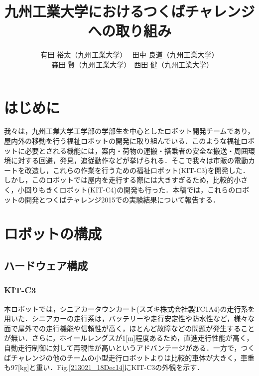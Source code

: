 \documentclass[10pt,a4paper]{jarticle}
\begin{document}
\title{\fontsize{16pt}{0pt}\selectfont 九州工業大学におけるつくばチャレンジへの取り組み}
\author{\fontsize{12pt}{0pt} 有田 裕太（九州工業大学）~ 田中 良道（九州工業大学） \\ ~ 森田 賢（九州工業大学）~西田 健（九州工業大学）}
\engtitle{
   \fontsize{16pt}{40pt}\selectfont 
}

\abstract{
\fontsize{9pt}{0pt}\selectfont
}

\maketitle\thispagestyle{empty}
\pagestyle{empty}

\section{はじめに}
\label{sec:intro}
我々は，九州工業大学工学部の学部生を中心としたロボット開発チームであり，屋内外の移動を行う福祉ロボットの開発に取り組んでいる．このような福祉ロボットに必要とされる機能には，案内・荷物の運搬・搭乗者の安全な搬送・周囲環境に対する回避，発見，追従動作などが挙げられる．そこで我々は市販の電動カートを改造し，これらの作業を行うための福祉ロボット(KIT-C3)を開発した．しかし，このロボットでは屋内を走行する際には大きすぎるため，比較的小さく，小回りもきくロボット(KIT-C4)の開発も行った．本稿では，これらのロボットの開発とつくばチャレンジ2015での実験結果について報告する．

\section{ロボットの構成}
\subsection{ハードウェア構成}
\subsubsection{KIT-C3}
本ロボットでは，シニアカータウンカート(スズキ株式会社製TC1A4)の走行系を用いた．シニアカーの走行系は，バッテリーや走行安定性や防水性など，様々な面で屋外での走行機能や信頼性が高く，ほとんど故障などの問題が発生することが無い．さらに，ホイールレングスが1[m]程度あるため，直進走行性能が高く，自動走行制御に対して再現性が高いというアドバンテージがある．一方で，つくばチャレンジの他のチームの小型走行ロボットよりは比較的車体が大きく，車重も97[kg]と重い．Fig.\ref{213021_18Dec14}にKIT-C3の外観を示す．
\end{document}
